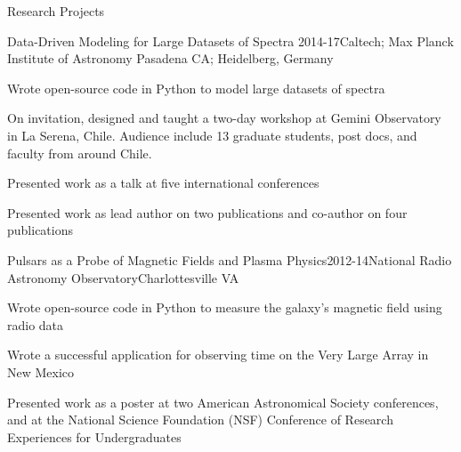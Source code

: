 \documentclass{resume} %
\begin{document}
\begin{rSection}{Research Projects}
  \begin{rSubsection}{Data-Driven Modeling for Large Datasets of Spectra}
    {2014-17}{Caltech; Max Planck Institute of Astronomy}
    {Pasadena CA; Heidelberg, Germany}
  \item
    Wrote open-source code in Python to model large datasets of spectra
  \item
    On invitation, designed and taught a two-day workshop
    at Gemini Observatory in La Serena, Chile. 
    Audience include 13 graduate students, post docs, and faculty from
    around Chile.
  \item
    Presented work as a talk at five international conferences
  \item
    Presented work as lead author on two publications and 
    co-author on four publications
\end{rSubsection}

\begin{rSubsection}{Pulsars as a Probe of Magnetic Fields and Plasma Physics}{2012-14}{National Radio Astronomy Observatory}{Charlottesville VA}
  \item 
    Wrote open-source code in Python to measure the 
    galaxy's magnetic field using radio data
  \item Wrote a successful application for observing time on the 
    Very Large Array in New Mexico
  \item Presented work as a poster at two
    American Astronomical Society conferences,
    and at the National Science Foundation (NSF) Conference of 
    Research Experiences for Undergraduates
\end{rSubsection}

\end{rSection}

\end{document}
